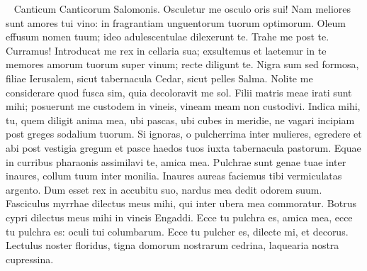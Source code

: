 
\begin{biblechapter}   
\verse Canticum Canticorum Salomonis. 
\verse Osculetur me osculo oris sui! Nam meliores sunt amores tui vino: 
\verse in fragrantiam unguentorum tuorum optimorum. Oleum effusum nomen tuum; ideo adulescentulae dilexerunt te. 
\verse Trahe me post te. Curramus! Introducat me rex in cellaria sua; exsultemus et laetemur in te memores amorum tuorum super vinum; recte diligunt te. 
\verse Nigra sum sed formosa, filiae Ierusalem, sicut tabernacula Cedar, sicut pelles Salma. 
\verse Nolite me considerare quod fusca sim, quia decoloravit me sol. Filii matris meae irati sunt mihi; posuerunt me custodem in vineis, vineam meam non custodivi. 
\verse Indica mihi, tu, quem diligit anima mea, ubi pascas, ubi cubes in meridie, ne vagari incipiam post greges sodalium tuorum. 
\verse Si ignoras, o pulcherrima inter mulieres, egredere et abi post vestigia gregum et pasce haedos tuos iuxta tabernacula pastorum. 
\verse Equae in curribus pharaonis assimilavi te, amica mea. 
\verse Pulchrae sunt genae tuae inter inaures, collum tuum inter monilia. 
\verse Inaures aureas faciemus tibi vermiculatas argento. 
\verse Dum esset rex in accubitu suo, nardus mea dedit odorem suum. 
\verse Fasciculus myrrhae dilectus meus mihi, qui inter ubera mea commoratur. 
\verse Botrus cypri dilectus meus mihi in vineis Engaddi. 
\verse Ecce tu pulchra es, amica mea, ecce tu pulchra es: oculi tui columbarum. 
\verse Ecce tu pulcher es, dilecte mi, et decorus. Lectulus noster floridus, 
\verse tigna domorum nostrarum cedrina, laquearia nostra cupressina. 
\end{biblechapter}

